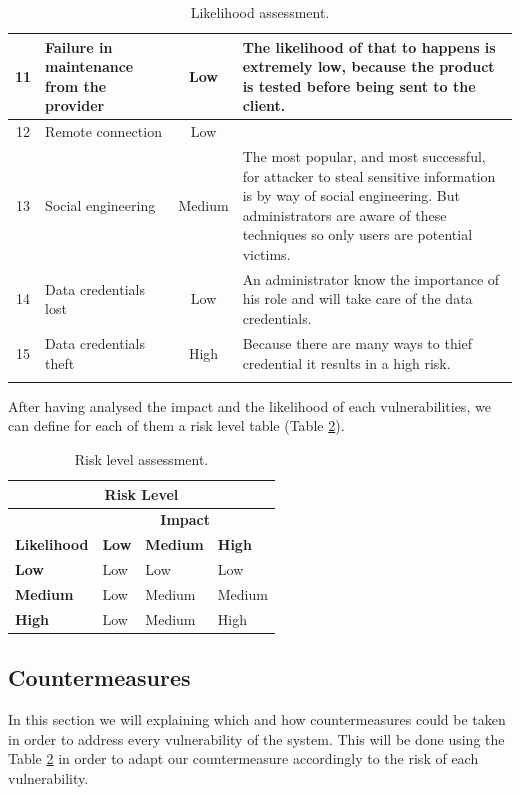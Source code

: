 \documentclass[a4paper,10pt]{article}
\begin{document}
\begin{longtable}{|c|p{}|c|p{10cm}|}
\hline
11 & Failure in maintenance from the provider & Low  & The likelihood of that to happens is extremely low, because the product is tested before being sent to the client.  \\
\hline
12 & Remote connection & Low & \\
\hline
13 & Social engineering  & Medium & The most popular, and most successful, for attacker to steal sensitive information is by way of social engineering. But administrators are aware of these techniques so only users are potential victims. \\
\hline
14 & Data credentials lost & Low & An administrator know the importance of his role and will take care of the data credentials. \\
\hline
15 &  Data credentials theft&  High & Because there are many ways to thief credential it results in a high risk. \\
\hline
\caption{Likelihood assessment.}
\label{tab:likelihood}
\end{longtable}

After having analysed the impact and the likelihood of each vulnerabilities, we can define for each of them a risk level table (Table \ref{tab:risk}).

\begin{table}[!h]
	\centering
	\begin{tabular}{|l|l|l|l|}
		\hline
		\multicolumn{4}{|c|}{\textbf{Risk Level}} \\
		\hline
		 & \multicolumn{3}{|c|}{\textbf{Impact}}  \\ \hline
		\textbf{Likelihood} & \textbf{Low} & \textbf{Medium} & \textbf{High} \\ \hline
		\textbf{Low}& Low & Low & Low \\ \hline
		\textbf{Medium} & Low & Medium & Medium \\ \hline
		\textbf{High} & Low & Medium & High \\ \hline
	\end{tabular}
	\caption{Risk level assessment.}
	\label{tab:risk}
\end{table} 



\subsection{Countermeasures}
In this section we will explaining which and how countermeasures could be taken in order to address every vulnerability of the system. This will be done using the Table \ref{tab:risk} in order to adapt our countermeasure accordingly to the risk of each vulnerability.
\end{document}
